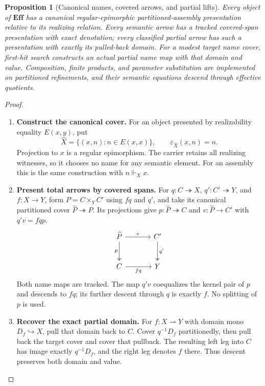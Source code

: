 \documentclass[11pt,a4paper]{article}
\numberwithin{algorithm}{section}
\numberwithin{equation}{section}
\newtheorem{proposition}[proposition]{Proposition}
\theoremstyle{definition}
\theoremstyle{remark}
\theoremstyle{plain}
\newcommand{\Eff}{\mathbf{Eff}}
\newcommand{\incl}{\hookrightarrow}
\newcommand{\onto}{\twoheadrightarrow}
\newcommand{\pmap}{\rightharpoonup}
\theoremstyle{definition}
\theoremstyle{plain}
\begin{document}
\begin{proposition}[Canonical names, covered arrows, and partial lifts]
\label{prop:standalone-name-lifting}
Every object of $\Eff$ has a canonical regular-epimorphic
partitioned-assembly presentation relative to its realizing relation.
Every semantic arrow has a tracked covered-span presentation with
exact denotation; every classified partial arrow has such a
presentation with exactly its pulled-back domain. For a modest target
name cover, first-hit search constructs an actual partial name map
with that domain and value. Composition, finite products, and
parameter substitution are implemented on partitioned refinements,
and their semantic equations descend through effective quotients.
\end{proposition}
\begin{proof}\leavevmode
\begin{enumerate}[leftmargin=*,align=left]
\item \textbf{Construct the canonical cover.}
For an object presented by realizability equality $E(x,y)$, put
\[
 \widehat X=\{(x,n):n\in E(x,x)\},\qquad
 \varepsilon_{\widehat X}(x,n)=n.
\]
Projection to $x$ is a regular epimorphism. The carrier retains all
realizing witnesses, so it chooses no name for any semantic element.
For an assembly this is the same construction with $n\Vdash_X x$.

\item \textbf{Present total arrows by covered spans.}
For $q:C\onto X$, $q':C'\onto Y$, and $f:X\to Y$, form
$P=C\times_Y C'$ using $fq$ and $q'$, and take its canonical
partitioned cover $\widehat P\onto P$. Its projections give
$p:\widehat P\onto C$ and $v:\widehat P\to C'$ with
$q'v=fqp$.
\[
\begin{tikzcd}[column sep=large,row sep=large]
\widehat P \arrow[r,"v"] \arrow[d,two heads,"p"'] &
C' \arrow[d,two heads,"q'"]\\
C \arrow[r,"fq"'] &Y
\end{tikzcd}
\]
Both name maps are tracked. The map $q'v$ coequalizes the kernel
pair of $p$ and descends to $fq$; its further descent through $q$
is exactly $f$. No splitting of $p$ is used.

\item \textbf{Recover the exact partial domain.}
For $f:X\pmap Y$ with domain mono $D_f\incl X$, pull that
domain back to $C$. Cover $q^{-1}D_f$ partitionedly, then pull
back the target cover and cover that pullback. The resulting
left leg into $C$ has image exactly $q^{-1}D_f$, and the right
leg denotes $f$ there. Thus descent preserves both domain and value.


\end{enumerate}
\end{proof}
\end{document}
